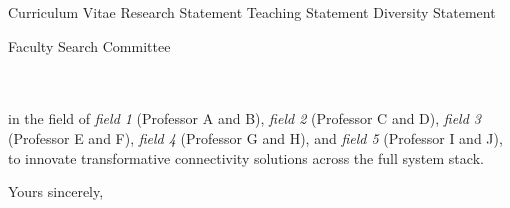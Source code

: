 



\addAttach%
{Curriculum Vitae}%
{Research Statement}%
{Teaching Statement}%
{Diversity Statement}
\def\appSpecific{with significant implications for the field of ABC}
\def\letterCustom{%
    in the field of \emph{field 1} (Professor A and B), \emph{field 2} (Professor C and D), \emph{field 3} (Professor E and F), \emph{field 4} (Professor G and H), and \emph{field 5} (Professor I and J), to innovate transformative connectivity solutions across the full system stack.%
}

\def\appJobID{%
    \ifthenelse{\equal{\jobID}{}}{\unskip}{\unskip\textemdash Job \# \jobID{}}%
}
\def\toAddr{%
Faculty Search Committee \\ \appDept{} \\ \appSchool{} \\ \appAddr{}%
}

\begin{letter}{\toAddr{}}
    \opening{\myOpening{}}
    
    \letterCustom{}
    
    \closing{Yours sincerely,}
    \encl{\listAttach{}}
\end{letter}
